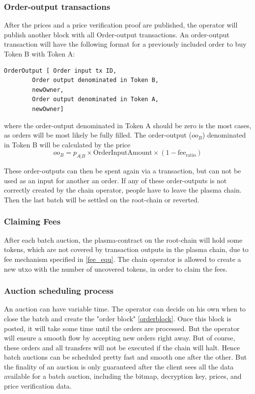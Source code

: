 \documentclass[11pt,parskip=full]{scrartcl}%
\begin{document}
\subsubsection{Order-output transactions} After the prices and a price verification proof are published, the operator will publish another block with all Order-output transactions. An order-output transaction will have the following format for a previously included order to buy Token B with Token A:
\begin{lstlisting}
OrderOutput [ Order input tx ID,
		Order output denominated in Token B, 
		newOwner,
		Order output denominated in Token A,
		newOwner]

\end{lstlisting}
where the order-output denominated in Token A should be zero is the most cases, as orders will be most likely be fully filled.
The order-output ($oo_B$) denominated in Token B will be calculated by the price 
\begin{equation}
	oo_B = p_{A|B} \times \text{OrderInputAmount} \times (1-\text{fee}_{\text{ratio}})
    \label{fee_equ}
\end{equation}

These order-outputs can then be spent again via a transaction, but can not be used as an input for another an order.
If any of these order-outputs is not correctly created by the chain operator, people have to leave the plasma chain. Then the last batch will be settled on the root-chain or reverted.

\subsubsection{Claiming Fees} After each batch auction, the plasma-contract on the root-chain will hold some tokens, which are not covered by transaction outputs in the plasma chain, due to fee mechanism specified in \ref{fee_equ}. The chain operator is allowed to create a new utxo with the number of uncovered tokens, in order to claim the fees.

\subsubsection{Auction scheduling process}
An auction can have variable time. The operator can decide on his own when to close the batch and create the "order block" \ref{orderblock}. Once this block is posted, it will take some time until the orders are processed. But the operator will ensure a smooth flow by accepting new orders right away. But of course, these orders and all transfers will not be executed if the chain will halt.
Hence batch auctions can be scheduled pretty fast and smooth one after the other. But the finality of an auction is only guaranteed after the client sees all the data available for a batch auction, including the bitmap, decryption key, prices, and price verification data.  
\end{document}
